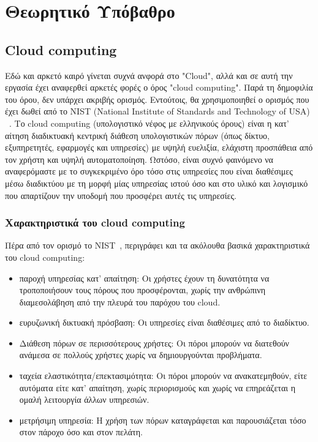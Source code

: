 \chapter{Θεωρητικό Υπόβαθρο}
\label{chap:background}

\section{Cloud computing}
Εδώ και αρκετό καιρό γίνεται συχνά ανφορά στο "Cloud", αλλά και σε αυτή την
εργασία έχει αναφερθεί αρκετές φορές ο όρος "cloud computing". Παρά τη δημοφιλία
του όρου, δεν υπάρχει ακριβής ορισμός. Εντούτοις, θα χρησιμοποιηθεί ο ορισμός
που έχει δωθεί από το NIST (National Institute of Standards and Technology of
USA) ~\cite{mell2011nist}. Το cloud computing (υπολογιστικό νέφος με ελληνικούς
όρους) είναι η κατ' αίτηση διαδικτυακή κεντρική διάθεση υπολογιστικών πόρων
(όπως δίκτυο, εξυπηρετητές, εφαρμογές και υπηρεσίες) με υψηλή ευελιξία, ελάχιστη
προσπάθεια από τον χρήστη και υψηλή αυτοματοποίηση. Ωστόσο, είναι συχνό
φαινόμενο να αναφερόμαστε με το συγκεκριμένο όρο τόσο στις υπηρεσίες που είναι
διαθέσιμες μέσω διαδικτύου με τη μορφή μίας υπηρεσίας ιστού όσο και στο υλικό
και λογισμικό που απαρτίζουν την υποδομή που προσφέρει αυτές τις υπηρεσίες. 

\subsection{Χαρακτηριστικά του cloud computing}

Πέρα από τον ορισμό το NIST~\cite{mell2011nist}, περιγράφει και τα ακόλουθα
βασικά χαρακτηριστικά του cloud computing: 

\begin{itemize}
\item παροχή υπηρεσίας κατ’ απαίτηση: Οι χρήστες έχουν τη δυνατότητα να
τροποποιήσουν τους πόρους που προσφέρονται, χωρίς την ανθρώπινη διαμεσολάβηση
από την πλευρά του παρόχου του cloud. 
\item ευρυζωνική δικτυακή πρόσβαση: Οι υπηρεσίες είναι διαθέσιμες από το
διαδίκτυο.
\item Διάθεση πόρων σε περισσότερους χρήστες: Οι πόροι μπορούν να διατεθούν
ανάμεσα σε πολλούς χρήστες χωρίς να δημιουργούνται προβλήματα.
\item ταχεία ελαστικότητα/επεκτασιμότητα: Οι πόροι μπορούν να ανακατεμηθούν,
είτε αυτόματα είτε κατ' απαίτηση, χωρίς περιορισμούς και χωρίς να επηρεάζεται η
ομαλή λειτουργία άλλων υπηρεσιών.
\item μετρήσιμη υπηρεσία: Η χρήση των πόρων καταγράφεται και παρουσιάζεται τόσο
στον πάροχο όσο και στον πελάτη.
\end{itemize}

